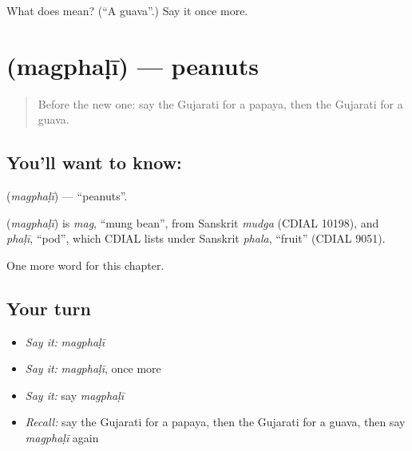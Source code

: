 \begin{tcolorbox}[breakable,colback=teal!4,colframe=teal!35!black,title={Before you move on}]
What does  mean? (\textquotedblleft{}A guava\textquotedblright{}.) Say it once more.
\end{tcolorbox}
\section[\texorpdfstring{\gu{મગફળી} (magphaḷī)}{મગફળી (magphaḷī)}]{ (magphaḷī) — peanuts}

\label{lesson:GU-C116-magphali}



\begin{quote}
Before the new one: say the Gujarati for a papaya, then the Gujarati for a guava.
\end{quote}

\subsection*{You'll want to know: }
\textbf{} (\emph{magphaḷī}) — \textquotedblleft{}peanuts\textquotedblright{}.

\begin{cousinweb}
\textbf{} (\emph{magphaḷī}) is \emph{mag}, \textquotedblleft{}mung bean\textquotedblright{}, from Sanskrit \emph{mudga} (CDIAL 10198), and \emph{phaḷī}, \textquotedblleft{}pod\textquotedblright{}, which CDIAL lists under Sanskrit \emph{phala}, \textquotedblleft{}fruit\textquotedblright{} (CDIAL 9051).
\end{cousinweb}

\begin{grammarlens}[title={What you've built}]
One more word for this chapter.
\end{grammarlens}

\subsection*{Your turn}
\begin{itemize}
\raggedright
  \item \emph{Say it:} \emph{magphaḷī}
  \item \emph{Say it:} \emph{magphaḷī}, once more
  \item \emph{Say it:} say \emph{magphaḷī}
  \item \emph{Recall:} say the Gujarati for a papaya, then the Gujarati for a guava, then say \emph{magphaḷī} again
\end{itemize}

